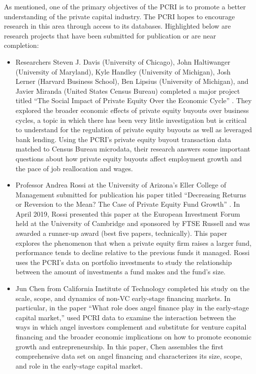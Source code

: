 As mentioned, one of the primary objectives of the PCRI is to promote a better understanding of the private capital industry. The PCRI hopes to encourage research in this area through access to its databases. Highlighted below are research projects that have been submitted for publication or are near completion:

\begin{itemize}
\item
  Researchers Steven J. Davis (University of Chicago), John Haltiwanger (University of Maryland), Kyle Handley (University of Michigan), Josh Lerner (Harvard Business School), Ben Lipsius (University of Michigan), and Javier Miranda (United States Census Bureau) completed a major project titled ``The Social Impact of Private Equity Over the Economic Cycle'' \citep{davis2019}. They explored the broader economic effects of private equity buyouts over business cycles, a topic in which there has been very little investigation but is critical to understand for the regulation of private equity buyouts as well as leveraged bank lending. Using the PCRI's private equity buyout transaction data matched to Census Bureau microdata, their research answers some important questions about how private equity buyouts affect employment growth and the pace of job reallocation and wages.
\item
  Professor Andrea Rossi at the University of Arizona's Eller College of Management submitted for publication his paper titled ``Decreasing Returns or Reversion to the Mean? The Case of Private Equity Fund Growth'' \citeyearpar{rossi2019}. In April 2019, Rossi presented this paper at the European Investment Forum held at the University of Cambridge and sponsored by FTSE Russell and was awarded a runner-up award (best five papers, technically). This paper explores the phenomenon that when a private equity firm raises a larger fund, performance tends to decline relative to the previous funds it managed. Rossi uses the PCRI's data on portfolio investments to study the relationship between the amount of investments a fund makes and the fund's size.
\item
  Jun Chen from California Institute of Technology completed his study on the scale, scope, and dynamics of non-VC early-stage financing markets. In particular, in the paper ``What role does angel finance play in the early-stage capital market,'' \citeyearpar{chen2017} used PCRI data to examine the interaction between the ways in which angel investors complement and substitute for venture capital financing and the broader economic implications on how to promote economic growth and entrepreneurship. In this paper, Chen assembles the first comprehensive data set on angel financing and characterizes its size, scope, and role in the early-stage capital market.

\end{itemize}
